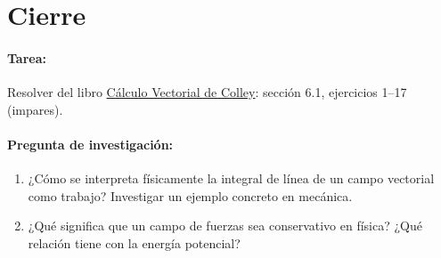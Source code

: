 \documentclass[a4,11pt]{aleph-notas}
\begin{document}
\section*{Cierre}

\paragraph{Tarea:}
Resolver del libro \href{https://catalogobiblioteca.puce.edu.ec/cgi-bin/koha/opac-detail.pl?biblionumber=83405&query_desc=su%3A%22An%C3%A1lisis%20vectorial%22}{Cálculo Vectorial de Colley}: sección 6.1, ejercicios 1--17 (impares).

\paragraph{Pregunta de investigación:}
\begin{enumerate}[leftmargin=*]
    \item ¿Cómo se interpreta físicamente la integral de línea de un campo vectorial como trabajo? Investigar un ejemplo concreto en mecánica.
    \item ¿Qué significa que un campo de fuerzas sea conservativo en física? ¿Qué relación tiene con la energía potencial?
\end{enumerate}
 
\end{document}
